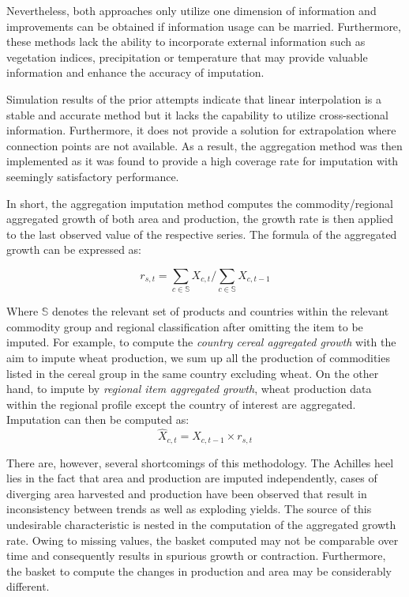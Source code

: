 \documentclass[nojss]{jss}\usepackage{graphicx, color}
\begin{document}
Nevertheless, both approaches only utilize one dimension of
information and improvements can be obtained if information usage
can be married. Furthermore, these methods lack the ability to
incorporate external information such as vegetation indices,
precipitation or temperature that may provide valuable information and
enhance the accuracy of imputation.

Simulation results of the prior attempts indicate that linear
interpolation is a stable and accurate method but it lacks the
capability to utilize cross-sectional information. Furthermore, it
does not provide a solution for extrapolation where connection points
are not available. As a result, the aggregation method was then
implemented as it was found to provide a high coverage rate for
imputation with seemingly satisfactory performance.

In short, the aggregation imputation method computes the
commodity/regional aggregated growth of both area and production, the
growth rate is then applied to the last observed value of the
respective series. The formula of the aggregated growth can be
expressed as:

\begin{equation}
  \label{eq:aggregateGrowth}
  r_{s, t} = \sum_{c \in \mathbb{S}} X_{c, t}/\sum_{c \in \mathbb{S}} X_{c, t-1}
\end{equation}

Where $\mathbb{S}$ denotes the relevant set of products and countries
within the relevant commodity group and regional classification after
omitting the item to be imputed. For example, to compute the
\textit{country cereal aggregated growth} with the aim to impute wheat
production, we sum up all the production of commodities listed in the
cereal group in the same country excluding wheat. On the other hand,
to impute by \textit{regional item aggregated growth}, wheat
production data within the regional profile except the country of
interest are aggregated.\\


Imputation can then be computed as:
\begin{equation}
  \hat{X}_{c, t} = X_{c, t-1} \times r_{s, t}
\end{equation}
  

There are, however, several shortcomings of this methodology. The
Achilles heel lies in the fact that area and production are imputed
independently, cases of diverging area harvested and production have
been observed that result in inconsistency between trends as well as
exploding yields. The source of this undesirable characteristic is
nested in the computation of the aggregated growth rate. Owing to
missing values, the basket computed may not be comparable over time
and consequently results in spurious growth or
contraction. Furthermore, the basket to compute the changes in
production and area may be considerably different.
\end{document}
